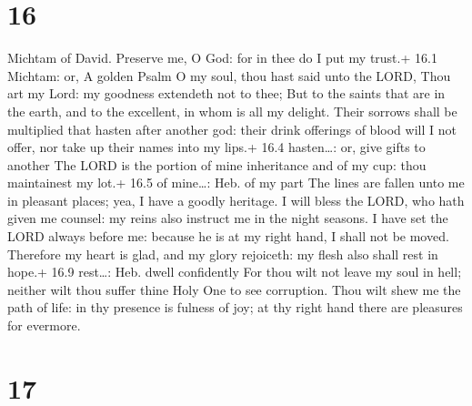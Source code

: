 \hypertarget{section-15}{%
\section{16}\label{section-15}}

Michtam of David.  Preserve me, O God: for in thee do I put
my trust.+ 16.1 Michtam: or, A golden Psalm  O my soul, thou
hast said unto the LORD, Thou art my Lord: my goodness extendeth not to
thee;  But to the saints that are in the earth, and to the
excellent, in whom is all my delight.  Their sorrows shall
be multiplied that hasten after another god: their drink offerings of
blood will I not offer, nor take up their names into my lips.+ 16.4
hasten\ldots: or, give gifts to another  The LORD is the
portion of mine inheritance and of my cup: thou maintainest my lot.+
16.5 of mine\ldots: Heb. of my part  The lines are fallen
unto me in pleasant places; yea, I have a goodly heritage. 
I will bless the LORD, who hath given me counsel: my reins also instruct
me in the night seasons.  I have set the LORD always before
me: because he is at my right hand, I shall not be moved. 
Therefore my heart is glad, and my glory rejoiceth: my flesh also shall
rest in hope.+ 16.9 rest\ldots: Heb. dwell confidently  For
thou wilt not leave my soul in hell; neither wilt thou suffer thine Holy
One to see corruption.  Thou wilt shew me the path of life:
in thy presence is fulness of joy; at thy right hand there are pleasures
for evermore.

\hypertarget{section-16}{%
\section{17}\label{section-16}}

